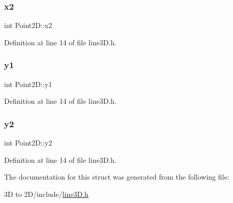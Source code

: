 \subsubsection{\texorpdfstring{x2}{x2}}
{\footnotesize\ttfamily int Point2\+D\+::x2}



Definition at line 14 of file line3\+D.\+h.

\mbox{\label{struct_point2_d_ac09354a3ad6dff717cf382c7db2d185f}} 
\subsubsection{\texorpdfstring{y1}{y1}}
{\footnotesize\ttfamily int Point2\+D\+::y1}



Definition at line 14 of file line3\+D.\+h.

\mbox{\label{struct_point2_d_aad6ee2882c6ac4b12b924b940a9cd015}} 
\subsubsection{\texorpdfstring{y2}{y2}}
{\footnotesize\ttfamily int Point2\+D\+::y2}



Definition at line 14 of file line3\+D.\+h.



The documentation for this struct was generated from the following file\+:\begin{DoxyCompactItemize}
\item 
3\+D to 2\+D/include/\mbox{\hyperlink{line3_d_8h}{line3\+D.\+h}}\end{DoxyCompactItemize}
